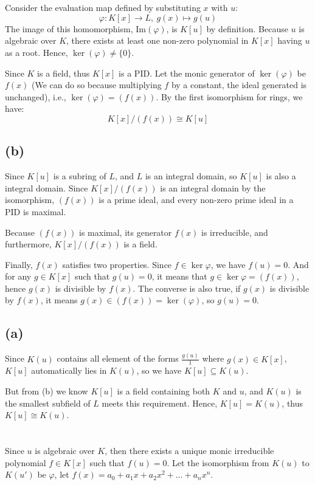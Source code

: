 \documentclass[12pt]{article}
\title{\mytitle}
\author{\textbf{\myauthor}}
\date{}
\begin{document}
\maketitle

\section{}
Consider the evaluation map defined by substituting $x$ with $u$:
$$\varphi: K[x]\rightarrow L,\ g(x)\mapsto g(u)$$
The image of this homomorphism, $\mathrm{Im}{(\varphi)}$, is $K[u]$ by definition. Because $u$ is algebraic over $K$, there exists at least one non-zero polynomial in $K[x]$ having $u$ as a root. Hence, $\ker{(\varphi)}\ne \{0\}$.

Since $K$ is a field, thus $K[x]$ is a PID. Let the monic generator of $\ker{(\varphi)}$ be $f(x)$ (We can do so because multiplying $f$ by a constant, the ideal generated is unchanged), i.e., $\ker{(\varphi)}=(f(x))$. By the first isomorphism for rings, we have:
$$K[x]/(f(x))\cong K[u]$$
\subsection{(b)}
Since $K[u]$ is a subring of $L$, and $L$ is an integral domain, so $K[u]$ is also a integral domain. Since $K[x]/(f(x))$ is an integral domain by the isomorphism, $(f(x))$ is a prime ideal, and every non-zero prime ideal in a PID is maximal.

Because $(f(x))$ is maximal, its generator $f(x)$ is irreducible, and furthermore, $K[x]/(f(x))$ is a field.

Finally, $f(x)$ satisfies two properties. Since $f\in \ker{\varphi}$, we have $f(u)=0$. And for any $g\in K[x]$ such that $g(u)=0$, it means that $g\in \ker{\varphi}=(f(x))$, hence $g(x)$ is divisible by $f(x)$. The converse is also true, if $g(x)$ is divisible by $f(x)$, it means $g(x)\in (f(x))=\ker{(\varphi)}$, so $g(u)=0$.

\subsection{(a)}
Since $K(u)$ contains all element of the forms $\frac{g(u)}{1}$ where $g(x)\in K[x]$, $K[u]$ automatically lies in $K(u)$, so we have $K[u]\subseteq K(u)$.

But from (b) we know $K[u]$ is a field containing both $K$ and $u$, and $K(u)$ is the smallest subfield of $L$ meets this requirement. Hence, $K[u]=K(u)$, thus $K[u]\cong K(u)$.
\section{}
Since $u$ is algebraic over $K$, then there exists a unique monic irreducible polynomial $f\in K[x]$ such that $f(u)=0$. Let the isomorphism from $K(u)$ to $K(u')$ be $\varphi$, let $f(x)=a_0+a_1x+a_2x^2+\ldots+ a_nx^n$.
\end{document}
